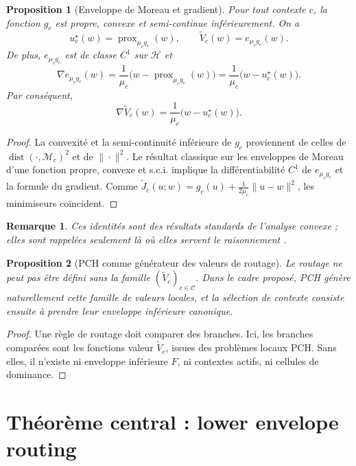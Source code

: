 \documentclass[11pt,a4paper]{article}
\newtheorem{proposition}{Proposition}[section]
\newtheorem{remark}{Remarque}[section]
\DeclareMathOperator{\prox}{prox}
\DeclareMathOperator{\dist}{dist}
\newcommand{\Hh}{\mathcal H}
\newcommand{\Mcal}{\mathcal M}
\newcommand{\Ccal}{\mathcal C}
\begin{document}
\begin{proposition}[Enveloppe de Moreau et gradient]
Pour tout contexte \(c\), la fonction \(g_c\) est propre, convexe et semi-continue inférieurement. On a
\[
 u_c^\star(w)=\prox_{\mu_c g_c}(w),
\qquad
 \widetilde V_c(w)=e_{\mu_c g_c}(w).
\]
De plus, \(e_{\mu_c g_c}\) est de classe \(C^1\) sur \(\Hh\) et
\[
\nabla e_{\mu_c g_c}(w)=\frac{1}{\mu_c}\bigl(w-\prox_{\mu_c g_c}(w)\bigr)
=\frac{1}{\mu_c}\bigl(w-u_c^\star(w)\bigr).
\]
Par conséquent,
\[
\nabla \widetilde V_c(w)=\frac{1}{\mu_c}\bigl(w-u_c^\star(w)\bigr).
\]
\end{proposition}

\begin{proof}
La convexité et la semi-continuité inférieure de \(g_c\) proviennent de celles de \(\dist(\cdot,\Mcal_c)^2\) et de \(\|\cdot\|^2\). Le résultat classique sur les enveloppes de Moreau d'une fonction propre, convexe et s.c.i. implique la différentiabilité \(C^1\) de \(e_{\mu_c g_c}\) et la formule du gradient. Comme \(\widetilde J_c(u;w)=g_c(u)+\frac{1}{2\mu_c}\|u-w\|^2\), les minimiseurs coïncident.
\end{proof}

\begin{remark}
Ces identités sont des résultats standards de l'analyse convexe ; elles sont rappelées seulement là où elles servent le raisonnement \cite{Moreau1965,Rockafellar1970,BauschkeCombettes2017,RockafellarWets1998}.
\end{remark}

\begin{proposition}[PCH comme générateur des valeurs de routage]
Le routage ne peut pas être défini sans la famille \((\widetilde V_c)_{c\in\Ccal}\). Dans le cadre proposé, PCH génère naturellement cette famille de valeurs locales, et la sélection de contexte consiste ensuite à prendre leur enveloppe inférieure canonique.
\end{proposition}

\begin{proof}
Une règle de routage doit comparer des branches. Ici, les branches comparées sont les fonctions valeur \(\widetilde V_c\), issues des problèmes locaux PCH. Sans elles, il n'existe ni enveloppe inférieure \(F\), ni contextes actifs, ni cellules de dominance.
\end{proof}

\section{Théorème central : lower envelope routing}
\end{document}
